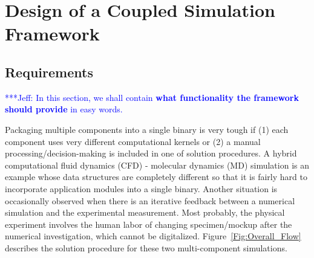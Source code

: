 \documentclass[10pt,conference]{IEEEtran}
\newcommand{\skonote}[1]{ {\textcolor{blue} { ***Jeff: #1 }}}
\newcommand{\skonote}[1]{}
\begin{document}
\section{Design of a Coupled Simulation Framework}
\label{sec:design}

\subsection{Requirements}
\skonote{In this section, we shall contain \textbf{what functionality the framework should provide} in easy words.}

Packaging multiple components into a single binary is very tough if (1) 
each component uses very different computational kernels or (2) a 
manual processing/decision-making is included in one of solution 
procedures. A hybrid computational fluid dynamics (CFD) - molecular 
dynamics (MD) simulation is an example whose data structures are 
completely different so that it is fairly hard to incorporate 
application modules into a single binary. Another situation is 
occasionally observed when there is an iterative feedback between a 
numerical simulation and the experimental measurement. Most probably, 
the physical experiment involves the human labor of changing 
specimen/mockup after the numerical investigation, which cannot be 
digitalized. Figure~\ref{Fig:Overall_Flow} describes the solution 
procedure for these two multi-component simulations.
\end{document}
